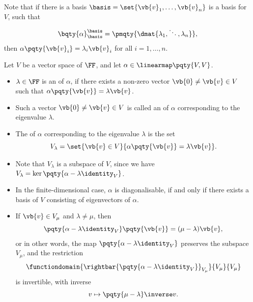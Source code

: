 Note that if there is a basis \(\basis = \set{\vb{v}_1, \ldots, \vb{v}_n}\) is a basis for \(V\), such that
\[
    \bqty{\alpha}_{\basis}^{\basis} = \pmqty{\dmat{\lambda_1, \ddots, \lambda_n}},
\]
then \(\alpha\pqty{\vb{v}_i} = \lambda_i \vb{v}_i\) for all \(i = 1, \ldots, n\).

\begin{definition}
    Let \(V\) be a vector space of \(\FF\), and let \(\alpha \in \linearmap\pqty{V, V}\).
    \begin{itemize}
        \item \(\lambda \in \FF\) is an  of \(\alpha\), if there exists a non-zero vector \(\vb{0} \neq \vb{v} \in V\) such that \(\alpha\pqty{\vb{v}} = \lambda \vb{v}\).
        \item Such a vector \(\vb{0} \neq \vb{v} \in V\) is called an  of \(\alpha\) corresponding to the eigenvalue \(\lambda\).
        \item The  of \(\alpha\) corresponding to the eigenvalue \(\lambda\) is the set
        \[
            V_{\lambda} = \set{\vb{v} \in V}{\alpha\pqty{\vb{v}} = \lambda \vb{v}}.
        \]

    \end{itemize}
\end{definition}

\begin{remark}
    \begin{itemize}
        \item Note that \(V_{\lambda}\) is a subspace of \(V\), since we have \(V_{\lambda} = \ker\pqty{\alpha - \lambda \identity_V}\).
        \item In the finite-dimensional case, \(\alpha\) is diagonalisable, if and only if there exists a basis of \(V\) consisting of eigenvectors of \(\alpha\).
        \item If \(\vb{v} \in V_{\mu}\) and \(\lambda \neq \mu\), then
        \[
            \pqty{\alpha - \lambda \identity_V}\pqty{\vb{v}} = (\mu - \lambda) \vb{v},
        \]
        or in other words, the map \(\pqty{\alpha - \lambda \identity_V}\) preserves the subspace \(V_{\mu}\), and the restriction
        \[
            \functiondomain{\rightbar{\pqty{\alpha - \lambda \identity_V}}_{V_{\mu}}}{V_{\mu}}{V_{\mu}}
        \]
        is invertible, with inverse
        \[
            v \mapsto \pqty{\mu - \lambda}\inverse v.
        \]
    \end{itemize}
\end{remark}

